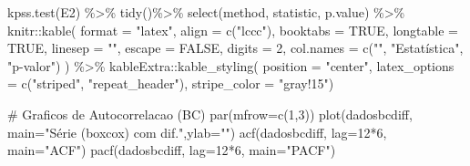 \documentclass[
  letterpaper,
  DIV=11,
  numbers=noendperiod]{scrartcl}
\newenvironment{Shaded}{\begin{snugshade}}{\end{snugshade}}
\newcommand{\AttributeTok}[1]{\textcolor[rgb]{0.40,0.45,0.13}{#1}}
\newcommand{\CommentTok}[1]{\textcolor[rgb]{0.37,0.37,0.37}{#1}}
\newcommand{\ConstantTok}[1]{\textcolor[rgb]{0.56,0.35,0.01}{#1}}
\newcommand{\DecValTok}[1]{\textcolor[rgb]{0.68,0.00,0.00}{#1}}
\newcommand{\FunctionTok}[1]{\textcolor[rgb]{0.28,0.35,0.67}{#1}}
\newcommand{\NormalTok}[1]{\textcolor[rgb]{0.00,0.23,0.31}{#1}}
\newcommand{\SpecialCharTok}[1]{\textcolor[rgb]{0.37,0.37,0.37}{#1}}
\newcommand{\StringTok}[1]{\textcolor[rgb]{0.13,0.47,0.30}{#1}}
\begin{document}
\begin{Shaded}
\begin{Highlighting}[]
\FunctionTok{kpss.test}\NormalTok{(E2) }\SpecialCharTok{\%\textgreater{}\%} 
  \FunctionTok{tidy}\NormalTok{()}\SpecialCharTok{\%\textgreater{}\%}
  \FunctionTok{select}\NormalTok{(method, statistic, }\StringTok{\textasciigrave{}}\AttributeTok{p.value}\StringTok{\textasciigrave{}}\NormalTok{) }\SpecialCharTok{\%\textgreater{}\%}
\NormalTok{  knitr}\SpecialCharTok{::}\FunctionTok{kable}\NormalTok{(}
    \AttributeTok{format =} \StringTok{"latex"}\NormalTok{,}
    \AttributeTok{align =} \FunctionTok{c}\NormalTok{(}\StringTok{"lccc"}\NormalTok{),}
    \AttributeTok{booktabs =} \ConstantTok{TRUE}\NormalTok{,}
    \AttributeTok{longtable =} \ConstantTok{TRUE}\NormalTok{,}
    \AttributeTok{linesep =} \StringTok{""}\NormalTok{,}
    \AttributeTok{escape =} \ConstantTok{FALSE}\NormalTok{,}
    \AttributeTok{digits =} \DecValTok{2}\NormalTok{,}
    \AttributeTok{col.names =} \FunctionTok{c}\NormalTok{(}\StringTok{""}\NormalTok{, }\StringTok{"Estatística"}\NormalTok{, }\StringTok{"p{-}valor"}\NormalTok{)}
\NormalTok{    ) }\SpecialCharTok{\%\textgreater{}\%}
\NormalTok{  kableExtra}\SpecialCharTok{::}\FunctionTok{kable\_styling}\NormalTok{(}
      \AttributeTok{position =} \StringTok{"center"}\NormalTok{,}
      \AttributeTok{latex\_options =} \FunctionTok{c}\NormalTok{(}\StringTok{"striped"}\NormalTok{, }\StringTok{"repeat\_header"}\NormalTok{),}
      \AttributeTok{stripe\_color =} \StringTok{"gray!15"}\NormalTok{)}


\CommentTok{\# Graficos de Autocorrelacao (BC)}
\FunctionTok{par}\NormalTok{(}\AttributeTok{mfrow=}\FunctionTok{c}\NormalTok{(}\DecValTok{1}\NormalTok{,}\DecValTok{3}\NormalTok{))}
\FunctionTok{plot}\NormalTok{(dadosbcdiff, }\AttributeTok{main=}\StringTok{"Série (boxcox) com dif."}\NormalTok{,}\AttributeTok{ylab=}\StringTok{""}\NormalTok{)}
\FunctionTok{acf}\NormalTok{(dadosbcdiff, }\AttributeTok{lag=}\DecValTok{12}\SpecialCharTok{*}\DecValTok{6}\NormalTok{, }\AttributeTok{main=}\StringTok{"ACF"}\NormalTok{)}
\FunctionTok{pacf}\NormalTok{(dadosbcdiff, }\AttributeTok{lag=}\DecValTok{12}\SpecialCharTok{*}\DecValTok{6}\NormalTok{, }\AttributeTok{main=}\StringTok{"PACF"}\NormalTok{)}



\end{Highlighting}
\end{Shaded}
\end{document}
